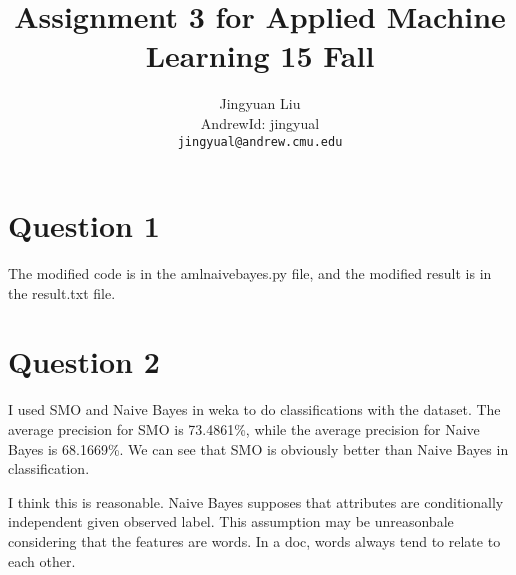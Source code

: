 \documentclass{article} %
\title{Assignment 3 for Applied Machine Learning 15 Fall}
\author{
Jingyuan Liu\\
AndrewId: jingyual\\
\texttt{jingyual@andrew.cmu.edu} \\
}
\begin{document}
\maketitle


\section{Question 1}
The modified code is in the amlnaivebayes.py file, and the modified result
is in the result.txt file.



\section{Question 2}
I used SMO and Naive Bayes in weka to do classifications with the dataset. The
average precision for SMO is 73.4861\%, while the average precision for Naive
Bayes is 68.1669\%. We can see that SMO is obviously better than Naive Bayes in
classification.

I think this is reasonable. Naive Bayes supposes that attributes are
conditionally independent given observed label. This assumption may be
unreasonbale considering that the features are words. In a doc, words always
tend to relate to each other.
\end{document}
